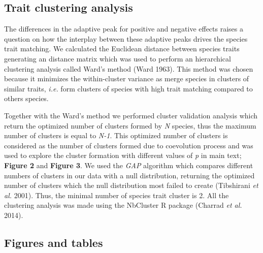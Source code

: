 \documentclass[a4paper, 12pt]{article}
\begin{document}
\subsection*{Trait clustering analysis}
The differences in the adaptive peak for positive and negative effects raises a question on how the interplay between these adaptive peaks drives the species trait matching. We calculated the Euclidean distance between species traits generating an distance matrix which was used to perform an hierarchical clustering analysis called Ward's method (Ward 1963). This method was chosen because it minimizes the within-cluster variance as merge species in clusters of similar traits, \textit{i.e.} form clusters of species with high trait matching compared to others species.

Together with the Ward's method we performed cluster validation analysis which return the optimized number of clusters formed by \textit{N} species, thus the maximum number of clusters is equal to \textit{N-1}. This optimized number of clusters is considered as the number of clusters formed due to coevolution process and was used to explore the cluster formation with different values of \textit{p} in main text; \textbf{Figure 2} and \textbf{Figure 3}. We used the \textit{GAP} algorithm which compares different numbers of clusters in our data with a null distribution, returning the optimized number of clusters which the null distribution most failed to create (Tibshirani \textit{et al.} 2001). Thus, the minimal number of species trait cluster is 2. All the clustering analysis was made using the NbCluster R package (Charrad \textit{et al.} 2014). 

\renewcommand{\thefigure}{S\arabic{figure}}
\setcounter{figure}{0}  

\subsection*{Figures and tables}
\end{document}
